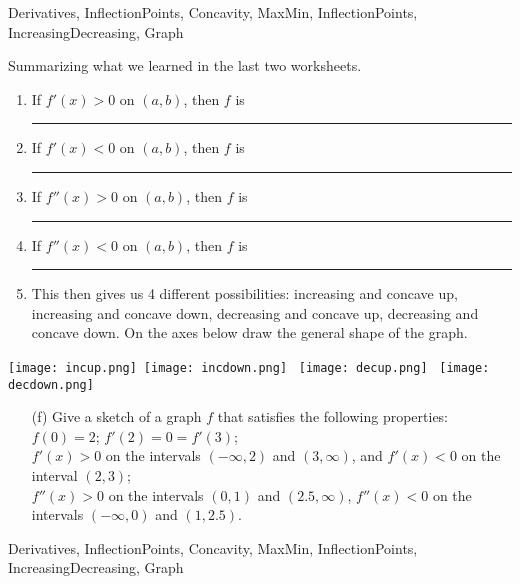 \begin{tagblock}{Derivatives, InflectionPoints, Concavity, MaxMin, InflectionPoints, IncreasingDecreasing, Graph}
\begin{question}

Summarizing what we learned in the last two worksheets.
\begin{enumerate}
\item If $f '(x) >0$ on $(a,b)$, then $f$ is  \rule{8cm}{0.1mm} 
\bigskip

\item If $f '(x) <0$ on $(a,b)$, then $f$ is  \rule{8cm}{0.1mm}
\bigskip
\item If $f ''(x) >0$ on $(a,b)$, then $f$ is  \rule{8cm}{0.1mm} 
\bigskip

\item If $f ''(x) <0$ on $(a,b)$, then $f$ is  \rule{8cm}{0.1mm} 
\bigskip 
\item This then gives us 4 different possibilities:  increasing and concave up, increasing and concave down, decreasing and concave up, decreasing and concave down.  On the axes below draw the general shape of the graph.
\end{enumerate}

\hangindent=-1in \texttt{[image: incup.png]}\, \texttt{[image: incdown.png]} \, \texttt{[image: decup.png]} \, \texttt{[image: decdown.png]} 
 
 \begin{enumerate}
 \item[(f)] Give a sketch of a graph $f$ that satisfies the following properties:  $f(0)=2$;  $f'(2) = 0 = f'(3)$; \\
 $f'(x) >0$ on the intervals $(-\infty, 2)$ and $(3, \infty)$, and $f'(x)<0$ on the interval $(2,3)$; \\
 $f''(x)>0$ on the intervals $(0,1)$ and $(2.5,\infty)$, $f''(x)<0$ on the intervals $(-\infty, 0)$ and $(1,2.5)$.
 

\end{enumerate}


	
\begin{tags}
	   Derivatives, InflectionPoints, Concavity, MaxMin, InflectionPoints, IncreasingDecreasing, Graph
\end{tags}
	
\begin{diary}
\end{diary}
	
\begin{solution}
	   
\end{solution}
	
\end{question}

\end{tagblock}

